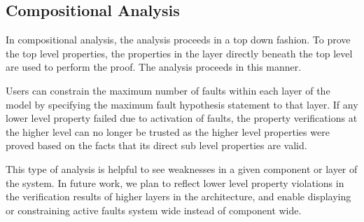 \subsection{Compositional Analysis}
In compositional analysis, the analysis proceeds in a top down fashion. To prove the top level properties, the properties in the layer directly beneath the top level are used to perform the proof. The analysis proceeds in this manner.

 Users can constrain the maximum number of faults within each layer of the model by specifying the maximum fault hypothesis statement to that layer. If any lower level property failed due to activation of faults, the property verifications at the higher level can no longer be trusted as the higher level properties were proved based on the facts that its direct sub level properties are valid.
 
 This type of analysis is helpful to see weaknesses in a given component or layer of the system. In future work, we plan to reflect lower level property violations in the verification results of higher layers in the architecture, and enable displaying or constraining active faults system wide instead of component wide.


